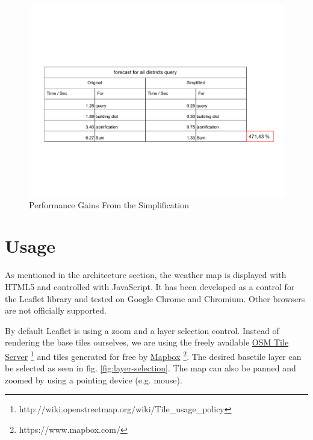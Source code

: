 \documentclass[paper=a4, fontsize=11pt]{article} %
\numberwithin{equation}{section} %
\numberwithin{figure}{section} %
\numberwithin{table}{section} %
\begin{document}
\begin{figure}[htbp]
	\centering
	\includegraphics[trim = 0mm 0mm 0mm 0mm, clip, width=1.1\textwidth]{pictures/simplification_table}
	\caption{Performance Gains From the Simplification}
	\label{simplification_table}
\end{figure}


\section{Usage}\label{usage}

As mentioned in the architecture section, the weather map is displayed
with HTML5 and controlled with JavaScript. It has been developed as a
control for the Leaflet library and tested on Google Chrome and
Chromium. Other browsers are not officially supported.

By default Leaflet is using a zoom and a layer selection control.
Instead of rendering the base tiles ourselves, we are using the freely
available
\href{http://wiki.openstreetmap.org/wiki/Tile_usage_policy}{OSM Tile
Server} \footnote{http://wiki.openstreetmap.org/wiki/Tile\_usage\_policy} and tiles generated for free by
\href{https://www.mapbox.com/}{Mapbox} \footnote{https://www.mapbox.com/}. The desired basetile layer can
be selected as seen in fig. \ref{fig:layer-selection}.
The map can also be panned and zoomed by using a pointing device
(e.g. mouse).
\end{document}
